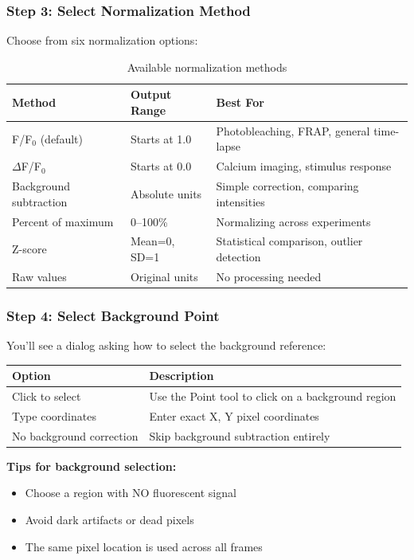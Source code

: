 \documentclass[11pt,a4paper]{article}
\begin{document}
\subsubsection{Step 3: Select Normalization Method}

Choose from six normalization options:

\begin{table}[h]
\centering
\begin{tabular}{@{}lll@{}}
\toprule
\textbf{Method} & \textbf{Output Range} & \textbf{Best For} \\
\midrule
F/F$_0$ (default) & Starts at 1.0 & Photobleaching, FRAP, general time-lapse \\
$\Delta$F/F$_0$ & Starts at 0.0 & Calcium imaging, stimulus response \\
Background subtraction & Absolute units & Simple correction, comparing intensities \\
Percent of maximum & 0--100\% & Normalizing across experiments \\
Z-score & Mean=0, SD=1 & Statistical comparison, outlier detection \\
Raw values & Original units & No processing needed \\
\bottomrule
\end{tabular}
\caption{Available normalization methods}
\end{table}

\subsubsection{Step 4: Select Background Point}

You'll see a dialog asking how to select the background reference:

\begin{table}[h]
\centering
\begin{tabular}{@{}ll@{}}
\toprule
\textbf{Option} & \textbf{Description} \\
\midrule
Click to select & Use the Point tool to click on a background region \\
Type coordinates & Enter exact X, Y pixel coordinates \\
No background correction & Skip background subtraction entirely \\
\bottomrule
\end{tabular}
\end{table}

\textbf{Tips for background selection:}
\begin{itemize}
    \item Choose a region with NO fluorescent signal
    \item Avoid dark artifacts or dead pixels
    \item The same pixel location is used across all frames
\end{itemize}
\end{document}
